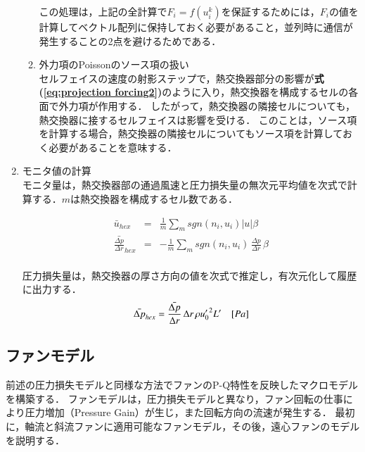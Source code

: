 \begin{enumerate}
\begin{enumerate}
この処理は，上記の全計算で$F_i = f(u_i^k)$を保証するためには，$F_i$の値を計算してベクトル配列に保持しておく必要があること，並列時に通信が発生することの2点を避けるためである．
\vspace{2mm}

\item 外力項のPoissonのソース項の扱い\\
セルフェイスの速度の射影ステップで，熱交換器部分の影響が\textbf{式(\ref{eq:projection forcing2})}のように入り，熱交換器を構成するセルの各面で外力項が作用する．
したがって，熱交換器の隣接セルについても，熱交換器に接するセルフェイスは影響を受ける．
このことは，ソース項を計算する場合，熱交換器の隣接セルについてもソース項を計算しておく必要があることを意味する．
\end{enumerate}

\vspace{2mm}

\item モニタ値の計算\\
モニタ量は，熱交換器部の通過風速と圧力損失量の無次元平均値を次式で計算する．$m$は熱交換器を構成するセル数である．

\begin{equation}
\begin{array}{lll}
\bar{u}_{hex}  &=& \displaystyle{  \frac{1}{m} \sum_m {sgn(n_i,u_i) \left| u \right| \beta} }\\
\displaystyle{\bar{\frac{\Delta p}{\Delta r}}_{hex}} &=& \displaystyle{ -\frac{1}{m} \sum_m {sgn(n_i,u_i) \, \frac{\Delta p}{\Delta r} \,\beta } }\\
\end{array}
\label{eq:hex monitor}
\end{equation}

圧力損失量は，熱交換器の厚さ方向の値を次式で推定し，有次元化して履歴に出力する．
\begin{equation}
\displaystyle{ \bar{\Delta p}_{hex} = \frac{\bar{\Delta p}}{\Delta r}\, {\Delta r} \, \rho {u_0^{\prime}}^2 L^{\prime} \quad [Pa]}\\
\label{eq:hex monitor2}
\end{equation}

\end{enumerate}

\pagebreak
%
\subsection{ファンモデル}
前述の圧力損失モデルと同様な方法でファンのP-Q特性を反映したマクロモデルを構築する．
ファンモデルは，圧力損失モデルと異なり，ファン回転の仕事により圧力増加（Pressure Gain）が生じ，また回転方向の流速が発生する．
最初に，軸流と斜流ファンに適用可能なファンモデル，その後，遠心ファンのモデルを説明する．


